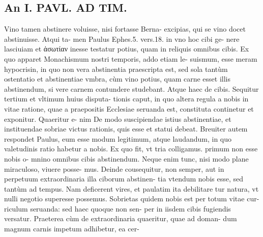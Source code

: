 \documentclass{article}
\begin{document}
\begin{pages}
\section*{An I. PAVL. AD TIM. }
\marginpar{[ p.Joo ]}\pstart Vino tamen abstinere voluisse, nisi fortasse Berna- excipias, qui se vino docet abstinuisse. Atqui ta- men Paulus Ephes.5. vers.18. in vno hoc cibi ge- nere lasciuiam et ἀσωτίαν inesse testatur potius, quam in reliquis omnibus cibis. Ex quo apparet Monachismum nostri temporis, addo etiam le- suismum, esse meram hypocrisin, in quo non vera abstinentia praescripta est, sed sola tantùm ostentatio et abstinentiae vmbra, cùm vino potius, quam carne esset illis abstinendum, si vere carnem contundere studebant. Atque haec de cibis.  \pend\pstart Sequitur tertium et vltimum huius disputa- tionis caput, in quo altera regula a nobis in vitae ratione, quae a praepositis Ecclesiae seruanda est, constituta continetur et exponitur. Quaeritur e- nim De modo suscipiendae istius abstinentiae, et instituendae sobriae victus rationis, quis esse et statui debeat. Breuiter autem respondet Paulus, eum esse modum legitimum, atque laudandum, in quo valetudinis ratio habetur a nobis. Ex quo fit, vt tria colligamus. primum non esse nobis o- mnino omnibus cibis abstinendum. Neque enim tunc, nisi modo plane miraculoso, viuere posse- mus. Deinde cousequitur, non semper, aut in perpetuum extraordinaria illa ciborum abstinen- tia vtendum nobis esse, sed tantùm ad tempus. Nam deficerent vires, et paulatim ita debilitare tur natura, vt nulli negotio superesse possemus. Sobrietas quidem nobis est per totum vitae cur- riculum seruanda: sed haec quoque non sen- per in iisdem cibis fugiendis versatur. Praeterea cùm de extraordinaria quaeritur, quae ad doman- dum magnum carnis impetum adhibetur, ea cer-  \pend

\end{pages}
\end{document}

